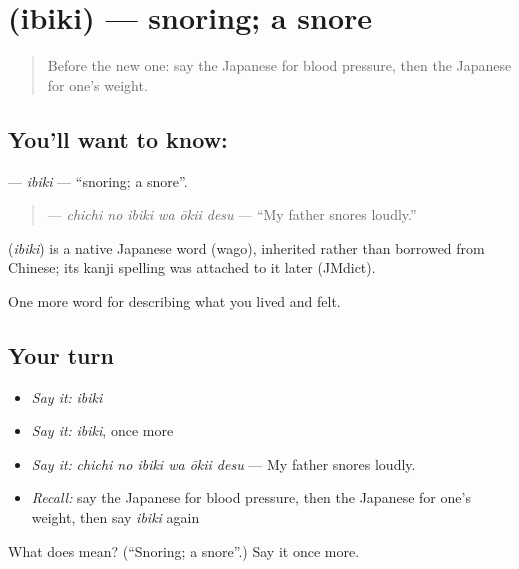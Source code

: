 \section[\texorpdfstring{\ja{いびき} (ibiki)}{いびき (ibiki)}]{ (ibiki) — snoring; a snore}

\label{lesson:JA-C444-ibiki}



\begin{quote}
Before the new one: say the Japanese for blood pressure, then the Japanese for one's weight.
\end{quote}

\subsection*{You'll want to know: }
\textbf{} — \emph{ibiki} — \textquotedblleft{}snoring; a snore\textquotedblright{}.

\begin{quote}
\textbf{  } — \emph{chichi no ibiki wa ōkii desu} — \textquotedblleft{}My father snores loudly.\textquotedblright{}
\end{quote}

\begin{cousinweb}
\textbf{} (\emph{ibiki}) is a native Japanese word (wago), inherited rather than borrowed from Chinese; its kanji spelling was attached to it later (JMdict).
\end{cousinweb}

\begin{grammarlens}[title={What you've built}]
One more word for describing what you lived and felt.
\end{grammarlens}

\subsection*{Your turn}
\begin{itemize}
\raggedright
  \item \emph{Say it:} \emph{ibiki}
  \item \emph{Say it:} \emph{ibiki}, once more
  \item \emph{Say it:} \emph{chichi no ibiki wa ōkii desu} — My father snores loudly.
  \item \emph{Recall:} say the Japanese for blood pressure, then the Japanese for one's weight, then say \emph{ibiki} again
\end{itemize}

\begin{tcolorbox}[breakable,colback=teal!4,colframe=teal!35!black,title={Before you move on}]
What does  mean? (\textquotedblleft{}Snoring; a snore\textquotedblright{}.) Say it once more.
\end{tcolorbox}
